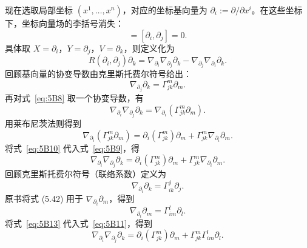 
现在选取局部坐标 $(x^1,\ldots,x^n)$，对应的坐标基向量为 $\partial_i:=\partial/\partial x^i$。在这些坐标下，坐标向量场的李括号消失：
\begin{equation*}
  [X,Y]=[\partial_i,\partial_j]=0.
  \tag{5B6}\label{eq:5B6}
\end{equation*}
具体取 $X=\partial_i$，$Y=\partial_j$，$V=\partial_k$，则定义化为
\begin{equation*}
  R(\partial_i,\partial_j)\partial_k
    =\nabla_{\partial_i}\nabla_{\partial_j}\partial_k
      -\nabla_{\partial_j}\nabla_{\partial_i}\partial_k.
  \tag{5B7}\label{eq:5B7}
\end{equation*}
回顾基向量的协变导数由克里斯托费尔符号给出：
\begin{equation*}
  \nabla_{\partial_j}\partial_k=\Gamma^m_{jk}\partial_m.
  \tag{5B8}\label{eq:5B8}
\end{equation*}
再对式~\eqref{eq:5B8} 取一个协变导数，有
\begin{equation*}
  \nabla_{\partial_i}\nabla_{\partial_j}\partial_k
     =\nabla_{\partial_i}(\Gamma^m_{jk}\partial_m).
  \tag{5B9}\label{eq:5B9}
\end{equation*}
用莱布尼茨法则得到
\begin{equation*}
  \nabla_{\partial_i}(\Gamma^m_{jk}\partial_m)
     =\partial_i(\Gamma^m_{jk})\partial_m
       +\Gamma^m_{jk}\nabla_{\partial_i}\partial_m.
  \tag{5B10}\label{eq:5B10}
\end{equation*}
将式~\eqref{eq:5B10} 代入式~\eqref{eq:5B9}，得
\begin{equation*}
  \nabla_{\partial_i}\nabla_{\partial_j}\partial_k
     =\partial_i(\Gamma^m_{jk})\partial_m
       +\Gamma^m_{jk}\nabla_{\partial_i}\partial_m.
  \tag{5B11}\label{eq:5B11}
\end{equation*}
回顾克里斯托费尔符号（联络系数）定义为
\begin{equation*}
  \nabla_{\partial_i}\partial_k=\Gamma^j_{ik}\partial_j.
  \tag{5B12}\label{eq:5B12}
\end{equation*}
原书将式 (5.42) 用于 $\nabla_{\partial_i}\partial_m$，得到
\begin{equation*}
  \nabla_{\partial_i}\partial_m=\Gamma^l_{im}\partial_l.
  \tag{5B13}\label{eq:5B13}
\end{equation*}
将式~\eqref{eq:5B13} 代入式~\eqref{eq:5B11}，得到
\begin{equation*}
  \nabla_{\partial_i}\nabla_{\partial_j}\partial_k
     =\partial_i(\Gamma^m_{jk})\partial_m+\Gamma^m_{jk}\Gamma^l_{im}\partial_l.
  \tag{5B14}\label{eq:5B14}
\end{equation*}
